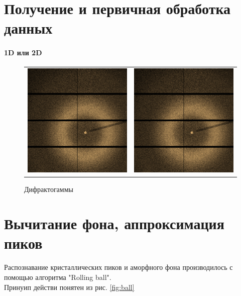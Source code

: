 	\section{Получение и первичная обработка данных}
	\paragraph{1D или 2D}
	
	\begin{figure}[ht]\center
\begin{tabular}{cc}
\includegraphics[width=0.5\linewidth]{fig/obj.png}
&
\includegraphics[width=0.5\linewidth]{fig/obj.png} 
\end{tabular}
\caption{Дифрактогаммы}
\end{figure}
	
	
	\section{Вычитание фона, аппроксимация пиков}
	Распознавание кристаллических пиков и аморфного фона производилось с помощью алгоритма "Rolling ball". \\
	Принуип действи понятен из рис. \ref{fig:ball}
	
